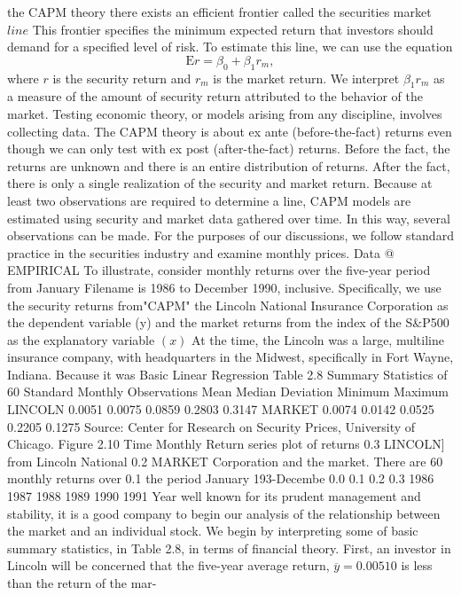 \documentclass[11pt]{article}
\begin{document}
the CAPM theory there exists an efficient frontier called the securities market
\(l i n e\) This frontier specifies the minimum expected return that investors should
 demand for a specified level of risk. To estimate this line, we can use the equation
\[
\textrm{E} r=\beta_{0}+\beta_{1} r_{m} ,
\]
where \(r\) is the security return and \(r_{m}\) is the market return. We interpret \(\beta_{1} r_{m}\) as a
 measure of the amount of security return attributed to the behavior of the market.
Testing economic theory, or models arising from any discipline, involves
collecting data. The CAPM theory is about ex ante (before-the-fact) returns even
though we can only test with ex post (after-the-fact) returns. Before the fact,
the returns are unknown and there is an entire distribution of returns. After the
fact, there is only a single realization of the security and market return. Because
 at least two observations are required to determine a line, CAPM models are
estimated using security and market data gathered over time. In this way, several
 observations can be made. For the purposes of our discussions, we follow standard
 practice in the securities industry and examine monthly prices.
 Data @ EMPIRICAL
To illustrate, consider monthly returns over the five-year period from January Filename is
1986 to December 1990, inclusive. Specifically, we use the security returns from"CAPM"
the Lincoln National Insurance Corporation as the dependent variable (y) and
the market returns from the index of the S\&P500 as the explanatory variable
\(( x )\) At the time, the Lincoln was a large, multiline insurance company, with
headquarters in the Midwest, specifically in Fort Wayne, Indiana. Because it was
 Basic Linear Regression
Table 2.8 Summary
Statistics of 60 Standard
Monthly Observations Mean Median Deviation Minimum Maximum
LINCOLN 0.0051 0.0075 0.0859 0.2803 0.3147
MARKET 0.0074 0.0142 0.0525 0.2205 0.1275
Source: Center for Research on Security Prices, University of Chicago.
Figure 2.10 Time Monthly Return
 series plot of returns 0.3 LINCOLN]
from Lincoln National 0.2 MARKET
Corporation and the
market. There are 60
monthly returns over 0.1
 the period January
193-Decembe 0.0
0.1
0.2
0.3
1986 1987 1988 1989 1990 1991
Year
well known for its prudent management and stability, it is a good company to
 begin our analysis of the relationship between the market and an individual stock.
We begin by interpreting some of basic summary statistics, in Table 2.8, in
terms of financial theory. First, an investor in Lincoln will be concerned that
the five-year average return, \(\overline{{y}}=0 . 0 0 5 1 0\) is less than the return of the mar-
\end{document}
